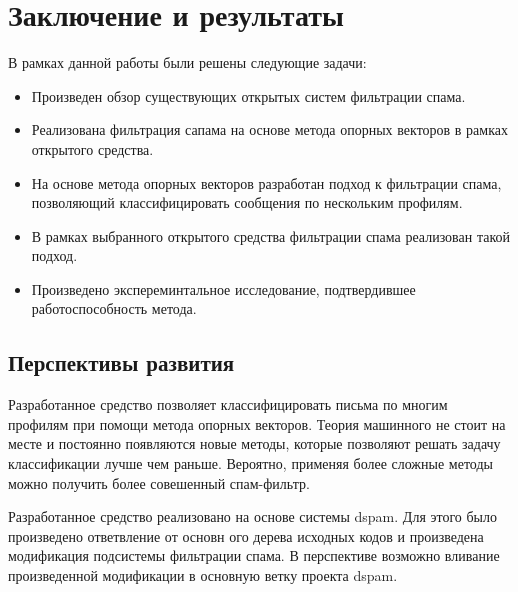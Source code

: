 \newpage
\section{Заключение и результаты}


В рамках данной	работы были решены следующие задачи:
\begin{itemize}
\item Произведен обзор существующих открытых систем фильтрации спама.
\item Реализована фильтрация сапама на основе метода опорных векторов в рамках открытого средства.
\item На основе метода опорных векторов разработан подход к фильтрации спама, позволяющий классифицировать сообщения по нескольким профилям.
\item В рамках выбранного открытого средства фильтрации спама реализован такой подход.
\item Произведено экспереминтальное исследование, подтвердившее работоспособность метода.
\end{itemize}

\subsection{Перспективы развития}
Разработанное средство позволяет классифицировать письма по многим профилям при помощи метода опорных векторов. Теория машинного не стоит на месте и постоянно появляются новые методы, которые позволяют решать задачу классификации лучше чем раньше. Вероятно, применяя более сложные методы можно получить более совешенный спам-фильтр.

Разработанное средство реализовано на основе системы dspam. Для этого было произведено ответвление от основн ого дерева исходных кодов и произведена модификация подсистемы фильтрации спама. В перспективе возможно вливание произведенной модификации в основную ветку проекта dspam. 
